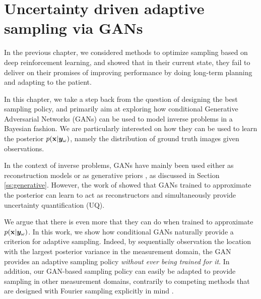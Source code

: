 \chapter{Uncertainty driven adaptive sampling via GANs} \label{ch:gans}
In the previous chapter, we considered methods to optimize sampling based on deep reinforcement learning, and showed that in their current state, they fail to deliver on their promises of improving performance by doing long-term planning and adapting to the patient. 

In this chapter, we take a step back from the question of designing the best sampling policy, and primarily aim at exploring how conditional Generative Adversarial Networks (GANs) \citep{goodfellow2014generative,mirza2014conditional} can be used to model inverse problems in a Bayesian fashion. We are particularly interested on how they can be used to learn  the posterior $p({\mathbf{x}}|{\bm{y}}_\omega)$, namely the distribution of ground truth images given observations. 

In the context of inverse problems, GANs have mainly been used either as reconstruction models \citep{yang_dagan_2018,chen2022ai} or as generative priors \citep{bora2017compressed,jalal2021robust}, as discussed in Section \ref{ss:generative}. However, the work of \citet{adler2018deep} showed that GANs trained to approximate the posterior can learn to act as reconstructors and simultaneously provide uncertainty quantification (UQ). 

We argue that there is even more that they can do when trained to approximate $p({\mathbf{x}}|{\bm{y}}_\omega)$. In this work, we show how conditional GANs naturally provide a criterion for adaptive sampling. Indeed, by sequentially observation the location with the largest posterior variance in the measurement domain, the GAN provides an adaptive sampling policy \textit{without ever being trained for it}.  In addition, our GAN-based sampling policy can easily be adapted to provide sampling in other measurement domains, contrarily to competing methods that are designed with Fourier sampling explicitly in mind \citep{zhang2019reducing}.

